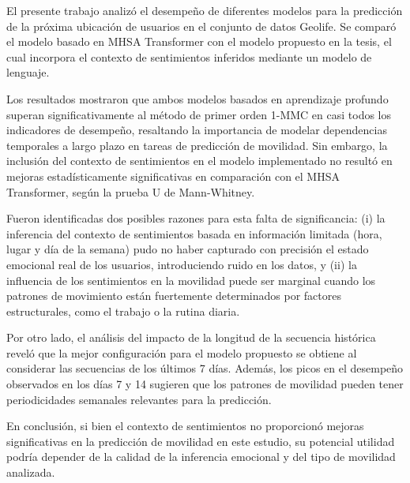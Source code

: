 \begin{conclusions}
    El presente trabajo analiz\'o el desempeño de diferentes modelos para 
    la predicción de la próxima ubicación de usuarios en el conjunto de 
    datos Geolife. Se comparó el modelo basado en MHSA Transformer con 
    el modelo propuesto en la tesis, el cual incorpora el contexto de sentimientos 
    inferidos mediante un modelo de lenguaje.

Los resultados mostraron que ambos modelos basados en aprendizaje profundo 
superan significativamente al método de primer orden 1-MMC en casi todos 
los indicadores de desempeño, resaltando la importancia de modelar 
dependencias temporales a largo plazo en tareas de predicción de 
movilidad. Sin embargo, la inclusión del contexto de sentimientos en 
el modelo implementado no resultó en mejoras estadísticamente significativas en 
comparación con el MHSA Transformer, según la prueba U de Mann-Whitney.

Fueron identificadas dos posibles razones para esta falta de significancia: 
(i) la inferencia del contexto de sentimientos basada en información 
limitada (hora, lugar y día de la semana) pudo no haber capturado con 
precisión el estado emocional real de los usuarios, introduciendo ruido 
en los datos, y (ii) la influencia de los sentimientos en la movilidad
puede ser marginal cuando los patrones de movimiento están fuertemente 
determinados por factores estructurales, como el trabajo o la rutina diaria.

Por otro lado, el análisis del impacto de la longitud de la secuencia 
histórica reveló que la mejor configuración para el modelo propuesto 
se obtiene al considerar las secuencias de los últimos 7 días. 
Además, los picos en el desempeño observados en los días 7 y 14 sugieren 
que los patrones de movilidad pueden tener periodicidades semanales 
relevantes para la predicción.

En conclusión, si bien el contexto de sentimientos no proporcionó mejoras 
significativas en la predicción de movilidad en este estudio, su 
potencial utilidad podría depender de la calidad de la inferencia 
emocional y del tipo de movilidad analizada.

\end{conclusions}
